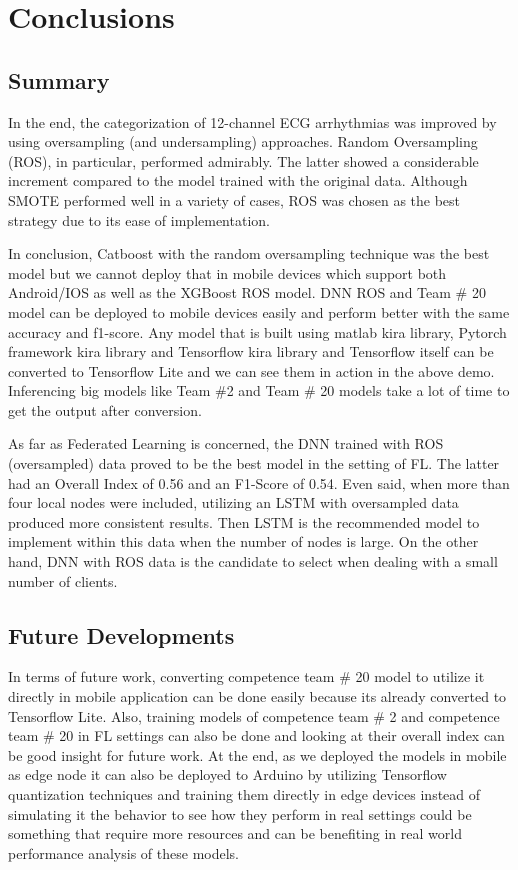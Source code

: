 \chapter{Conclusions} \label{chap6}

\section{Summary} \label{6summary}

In the end, the categorization of 12-channel ECG arrhythmias was improved by using oversampling (and undersampling) approaches. Random Oversampling (ROS), in particular, performed admirably. The latter showed a considerable increment compared to the model trained with the original data. Although SMOTE performed well in a variety of cases, ROS was chosen as the best strategy due to its ease of implementation.

In conclusion, Catboost with the random oversampling technique was the best model but we cannot deploy that in mobile devices which support both Android/IOS as well as the XGBoost ROS model. DNN ROS and Team \# 20 model can be deployed to mobile devices easily and perform better with the same accuracy and f1-score. Any model that is built using matlab kira library, Pytorch framework kira library and Tensorflow kira library and Tensorflow itself can be converted to Tensorflow Lite and we can see them in action in the above demo. Inferencing big models like Team \#2 and Team \# 20 models take a lot of time to get the output after conversion. 

As far as Federated Learning is concerned, the DNN trained with ROS (oversampled) data proved to be the best model in the setting of FL. The latter had an Overall Index of 0.56 and an F1-Score of 0.54. Even said, when more than four local nodes were included, utilizing an LSTM with oversampled data produced more consistent results. Then LSTM is the recommended model to implement within this data when the number of nodes is large. On the other hand, DNN with ROS data is the candidate to select when dealing with a small number of clients.



\section{Future Developments} \label{6futuredevelopments}

In terms of future work, converting competence team \# 20 model to utilize it directly in mobile application can be done easily because its already converted to Tensorflow Lite. Also, training models of competence team \# 2 and competence team \# 20 in FL settings can also be done and looking at their overall index can be good insight for future work. At the end, as we deployed the models in mobile as edge node it can also be deployed to Arduino by utilizing Tensorflow quantization techniques and training them directly in edge devices instead of simulating it the behavior to see how they perform in real settings could be something that require more resources and can be benefiting in real world performance analysis of these models. 


